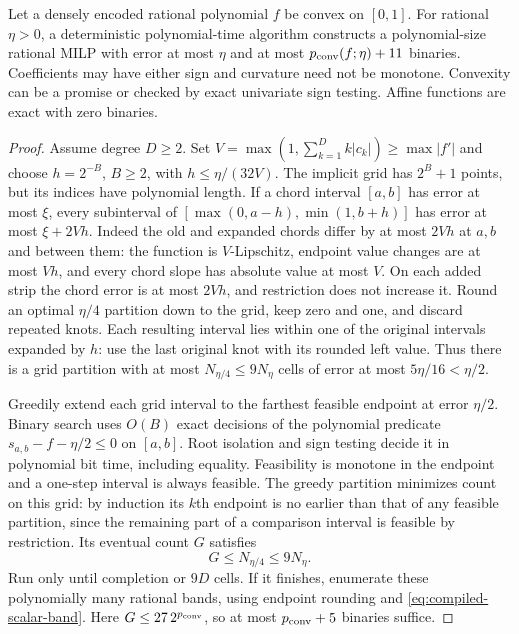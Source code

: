 \begin{theorem}\label{thm:convex-hybrid}
Let a densely encoded rational polynomial $f$ be convex on $[0,1]$.
For rational $\eta>0$, a deterministic polynomial-time algorithm
constructs a polynomial-size rational MILP with error at most $\eta$
and at most $p_{\mathrm{conv}}(f;\eta)+11$ binaries. Coefficients may have either
sign and curvature need not be monotone. Convexity can be a promise or
checked by exact univariate sign testing. Affine functions are exact
with zero binaries.
\end{theorem}
\begin{proof}
Assume degree $D\ge2$. Set
$V=\max(1,\sum_{k=1}^Dk|c_k|)\ge\max|f'|$ and choose
$h=2^{-B}$, $B\ge2$, with $h\le\eta/(32V)$. The implicit grid
has $2^B+1$ points, but its indices have polynomial length.
If a chord interval $[a,b]$ has error at most $\xi$, every subinterval
of $[\max(0,a-h),\min(1,b+h)]$ has error at most $\xi+2Vh$.
Indeed the old and expanded chords differ by at most $2Vh$ at $a,b$
and between them: the function is $V$-Lipschitz, endpoint value changes are at most
$Vh$, and every chord slope has absolute value at most $V$.
On each added strip the chord error is at most $2Vh$, and restriction
does not increase it. Round an optimal $\eta/4$ partition down to the
grid, keep zero and one, and discard repeated knots. Each resulting
interval lies within one of the original intervals expanded by $h$:
use the last original knot with its rounded left value. Thus there
is a grid partition with at most $N_{\eta/4}\le9N_\eta$ cells of
error at most $5\eta/16<\eta/2$.

Greedily extend each grid interval to the farthest feasible endpoint
at error $\eta/2$. Binary search uses $O(B)$ exact decisions of the
polynomial predicate $s_{a,b}-f-\eta/2\le0$ on $[a,b]$.
Root isolation and sign testing decide it in polynomial bit time,
including equality. Feasibility is monotone in the endpoint and a
one-step interval is always feasible. The greedy partition minimizes
count on this grid: by induction its $k$th endpoint is no earlier than
that of any feasible partition, since the remaining part of a comparison
interval is feasible by restriction. Its eventual count $G$ satisfies
\begin{equation}\label{eq:hybrid-greedy-count}
 G\le N_{\eta/4}\le9N_\eta.
\end{equation}
Run only until completion or $9D$ cells. If it finishes, enumerate
these polynomially many rational bands, using endpoint rounding and
\eqref{eq:compiled-scalar-band}. Here
$G\le27\,2^{p_{\mathrm{conv}}}$, so at most $p_{\mathrm{conv}}+5$ binaries suffice.


\end{proof}
